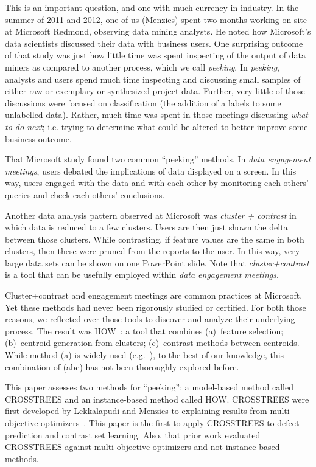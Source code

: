 \documentclass{sig-alternate}
\begin{document}
	This is an important question, and one with much currency in industry.
	In the summer of 2011 and 2012, one of us (Menzies) spent two months
	working on-site at Microsoft Redmond,
	observing data mining analysts.  He
	noted how Microsoft's data scientists
	discussed their data with  business users. 
	One surprising outcome of that study was just how
	little time was spent  
	inspecting  of the output of data miners as compared to another process, which we call {\em peeking}.
	In {\em peeking}, analysts and users spend much time
	inspecting and discussing small samples of either raw or exemplary or synthesized project data.  Further, very little of those discussions were  focused on classification
	(the addition of a labels to some unlabelled data). Rather, much time
	was spent in those meetings discussing {\em what to do next}; i.e. trying
	to determine what could be altered to better improve some business outcome.
	
	That   Microsoft  study found two common ``peeking'' methods.
	In {\em data engagement meetings},
	users debated the implications of data
	displayed on a screen. In this way, users
	engaged with the data and with each other by
	monitoring each others' queries and check each others'
	conclusions.
	
	Another data analysis pattern observed
	at Microsoft was  {\em cluster + contrast} in which
	data is  reduced to a few
	clusters. Users are then just shown the delta between those
	clusters. While contrasting, if feature values are
	the same in both clusters, then these were pruned from
	the reports to the user. In this way, very large
	data sets can be shown on one PowerPoint
	slide. Note that {\em cluster+contrast} is a tool that can be usefully employed within
	{\em data engagement meetings}.
	
	
	Cluster+contrast and engagement
	meetings are common practices at Microsoft. Yet  these methods had never been rigorously studied or certified.
	For both those reasons,
	we reflected over those tools to discover and analyze their
	underlying process. The result was HOW~\cite{howase}: a tool
	that combines (a)~feature selection; (b)~centroid generation from   clusters;
	(c)~contrast methods between centroids.
	While method (a) is widely used (e.g.~\cite{Menzies2010}),
	to the best of our knowledge, this combination of (abc) has not been thoroughly explored before.

This paper assesses two methods  for ``peeking'': a model-based method called CROSSTREES and an instance-based method   called HOW. 
CROSSTREES were first developed by Lekkalapudi and Menzies to  explaining results from multi-objective optimizers~\cite{nva14}. This paper is the first
to apply CROSSTREES to defect prediction and contrast set learning. Also, that prior work evaluated
CROSSTREES against multi-objective optimizers and not   instance-based methods.
\end{document}
